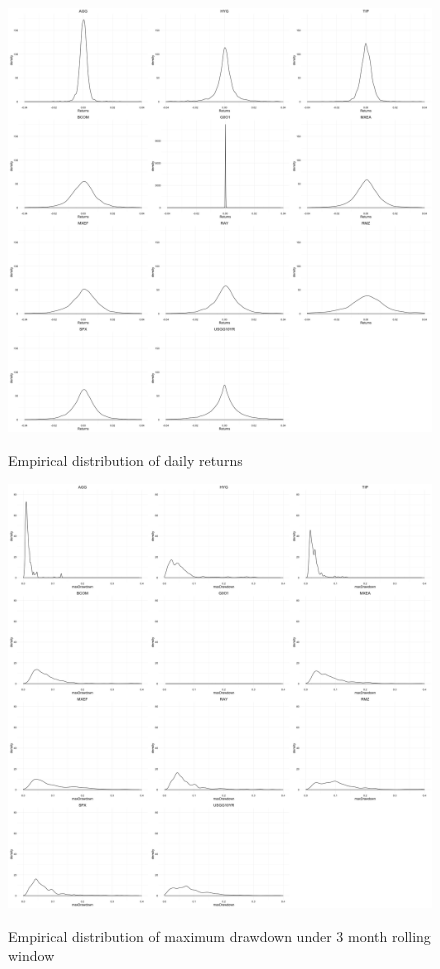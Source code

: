 \documentclass[12pt]{article}
\begin{document}
\begin{figure}[h]
\caption{Empirical distribution of daily returns} 
\centering 
\includegraphics[width=15cm]{../figures/summary_daily/returns_dist}
\label{fig: returnsDist}
\end{figure}

\begin{figure}[h]
\caption{Empirical distribution of maximum drawdown under 3 month rolling window} 
\centering
\includegraphics[width=15cm]{../figures/maxDrawdown_CED/maxDrawdown3mon}
\label{fig: dist_mdd}
\end{figure}
\end{document}
